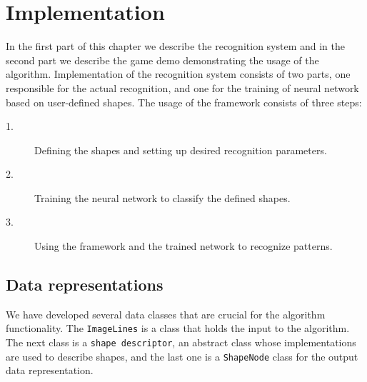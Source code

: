 \chapter{Implementation}
\label{ch:impl}
In the first part of this chapter we describe the recognition system and in the second part we describe the game demo demonstrating the usage of the algorithm. Implementation of the recognition system consists of two parts, one responsible for the actual recognition, and one for the training of neural network based on user-defined shapes. The usage of the framework consists of three steps:
\begin{description}
\item[1.] Defining the shapes and setting up desired recognition parameters.
\item[2.] Training the neural network to classify the defined shapes.
\item[3.] Using the framework and the trained network to recognize patterns.
\end{description}

\section{Data representations}
We have developed several data classes that are crucial for the algorithm functionality. The \texttt{ImageLines} is a class that holds the input to the algorithm. The next class is a \texttt{shape descriptor}, an abstract class whose implementations are used to describe shapes, and the last one is a \texttt{ShapeNode} class for the output data representation.

